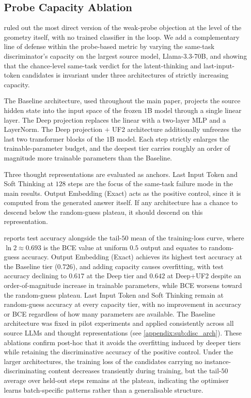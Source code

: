 \subsection{Probe Capacity Ablation}
\label{appendix:capacity_ablation}

 ruled out the most direct version of the weak-probe objection at the level of the geometry itself, with no trained classifier in the loop. We add a complementary line of defense within the probe-based metric by varying the same-task discriminator's capacity on the largest source model, Llama-3.3-70B, and showing that the chance-level same-task verdict for the latent-thinking and last-input-token candidates is invariant under three architectures of strictly increasing capacity.

The Baseline architecture, used throughout the main paper, projects the source hidden state into the input space of the frozen $1$B model through a single linear layer. The Deep projection replaces the linear with a two-layer MLP and a LayerNorm. The Deep projection $+$ UF2 architecture additionally unfreezes the last two transformer blocks of the $1$B model. Each step strictly enlarges the trainable-parameter budget, and the deepest tier carries roughly an order of magnitude more trainable parameters than the Baseline.

Three thought representations are evaluated as anchors. Last Input Token and Soft Thinking at $128$ steps are the focus of the same-task failure mode in the main results. Output Embedding (Exact) acts as the positive control, since it is computed from the generated answer itself. If any architecture has a chance to descend below the random-guess plateau, it should descend on this representation.



 reports test accuracy alongside the tail-$50$ mean of the training-loss curve, where $\ln 2 \approx 0.693$ is the BCE value at uniform $0.5$ output and equates to random-guess accuracy. Output Embedding (Exact) achieves its highest test accuracy at the Baseline tier ($0.726$), and adding capacity causes overfitting, with test accuracy declining to $0.617$ at the Deep tier and $0.642$ at Deep$+$UF2 despite an order-of-magnitude increase in trainable parameters, while BCE worsens toward the random-guess plateau. Last Input Token and Soft Thinking remain at random-guess accuracy at every capacity tier, with no improvement in accuracy or BCE regardless of how many parameters are available. The Baseline architecture was fixed in pilot experiments and applied consistently across all source LLMs and thought representations (see \cref{appendix:sub:disc_arch}). These ablations confirm post-hoc that it avoids the overfitting induced by deeper tiers while retaining the discriminative accuracy of the positive control. Under the larger architectures, the training loss of the candidates carrying no instance-discriminating content decreases transiently during training, but the tail-$50$ average over held-out steps remains at the plateau, indicating the optimiser learns batch-specific patterns rather than a generalisable structure.

